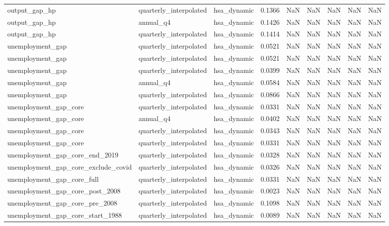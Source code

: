\begin{tabular}{lllrrrrrr}
output\_gap\_hp & quarterly\_interpolated & hsa\_dynamic & 0.1366 & NaN & NaN & NaN & NaN & NaN \\
output\_gap\_hp & annual\_q4 & hsa\_dynamic & 0.1426 & NaN & NaN & NaN & NaN & NaN \\
output\_gap\_hp & quarterly\_interpolated & hsa\_dynamic & 0.1414 & NaN & NaN & NaN & NaN & NaN \\
unemployment\_gap & quarterly\_interpolated & hsa\_dynamic & 0.0521 & NaN & NaN & NaN & NaN & NaN \\
unemployment\_gap & quarterly\_interpolated & hsa\_dynamic & 0.0521 & NaN & NaN & NaN & NaN & NaN \\
unemployment\_gap & quarterly\_interpolated & hsa\_dynamic & 0.0399 & NaN & NaN & NaN & NaN & NaN \\
unemployment\_gap & annual\_q4 & hsa\_dynamic & 0.0584 & NaN & NaN & NaN & NaN & NaN \\
unemployment\_gap & quarterly\_interpolated & hsa\_dynamic & 0.0866 & NaN & NaN & NaN & NaN & NaN \\
unemployment\_gap\_core & quarterly\_interpolated & hsa\_dynamic & 0.0331 & NaN & NaN & NaN & NaN & NaN \\
unemployment\_gap\_core & annual\_q4 & hsa\_dynamic & 0.0402 & NaN & NaN & NaN & NaN & NaN \\
unemployment\_gap\_core & quarterly\_interpolated & hsa\_dynamic & 0.0343 & NaN & NaN & NaN & NaN & NaN \\
unemployment\_gap\_core & quarterly\_interpolated & hsa\_dynamic & 0.0331 & NaN & NaN & NaN & NaN & NaN \\
unemployment\_gap\_core\_end\_2019 & quarterly\_interpolated & hsa\_dynamic & 0.0328 & NaN & NaN & NaN & NaN & NaN \\
unemployment\_gap\_core\_exclude\_covid & quarterly\_interpolated & hsa\_dynamic & 0.0326 & NaN & NaN & NaN & NaN & NaN \\
unemployment\_gap\_core\_full & quarterly\_interpolated & hsa\_dynamic & 0.0331 & NaN & NaN & NaN & NaN & NaN \\
unemployment\_gap\_core\_post\_2008 & quarterly\_interpolated & hsa\_dynamic & 0.0023 & NaN & NaN & NaN & NaN & NaN \\
unemployment\_gap\_core\_pre\_2008 & quarterly\_interpolated & hsa\_dynamic & 0.1098 & NaN & NaN & NaN & NaN & NaN \\
unemployment\_gap\_core\_start\_1988 & quarterly\_interpolated & hsa\_dynamic & 0.0089 & NaN & NaN & NaN & NaN & NaN \\

\end{tabular}
